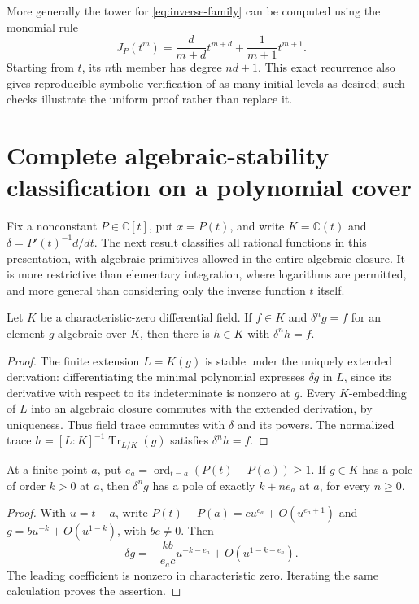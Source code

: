 More generally the tower for \eqref{eq:inverse-family} can be computed using
the monomial rule
\[
 J_P(t^m)=\frac{d}{m+d}t^{m+d}+\frac1{m+1}t^{m+1}.
\]
Starting from $t$, its $n$th member has degree $nd+1$. This exact recurrence
also gives reproducible symbolic verification of as many initial levels as
desired; such checks illustrate the uniform proof rather than replace it.
\section{Complete algebraic-stability classification on a polynomial cover}
\label{sec:classification}
Fix a nonconstant $P\in\mathbb C[t]$, put $x=P(t)$, and write
$K=\mathbb C(t)$ and $\delta=P'(t)^{-1}d/dt$.
The next result classifies all rational functions in this presentation,
with algebraic primitives allowed in the entire algebraic closure.
It is more restrictive than elementary integration, where logarithms
are permitted, and more general than considering only the inverse
function $t$ itself.

\begin{lemma}\label{lem:trace}
Let $K$ be a characteristic-zero differential field. If $f\in K$ and
$\delta^n g=f$ for an element $g$ algebraic over $K$, then there is
$h\in K$ with $\delta^n h=f$.
\end{lemma}
\begin{proof}
The finite extension $L=K(g)$ is stable under the uniquely extended
derivation: differentiating the minimal polynomial expresses $\delta g$
in $L$, since its derivative with respect to its indeterminate is nonzero
at $g$. Every $K$-embedding of $L$ into an algebraic closure commutes
with the extended derivation, by uniqueness. Thus field trace commutes
with $\delta$ and its powers. The normalized trace
$h=[L:K]^{-1}\operatorname{Tr}_{L/K}(g)$ satisfies $\delta^n h=f$.
\end{proof}

\begin{lemma}\label{lem:pole-growth}
At a finite point $a$, put
$e_a=\operatorname{ord}_{t=a}(P(t)-P(a))\ge1$.
If $g\in K$ has a pole of order $k>0$ at $a$, then $\delta^n g$
has a pole of exactly $k+ne_a$ at $a$, for every $n\ge0$.
\end{lemma}
\begin{proof}
With $u=t-a$, write $P(t)-P(a)=c u^{e_a}+O(u^{e_a+1})$ and
$g=b u^{-k}+O(u^{1-k})$, with $bc\ne0$. Then
\[
 \delta g=-\frac{kb}{e_a c}u^{-k-e_a}
                 +O(u^{1-k-e_a}).
\]
The leading coefficient is nonzero in characteristic zero. Iterating
the same calculation proves the assertion.
\end{proof}

